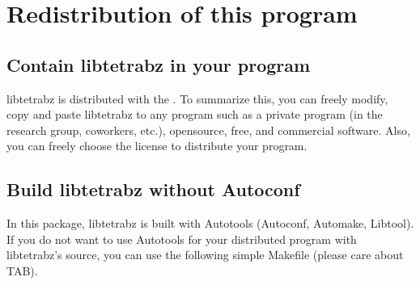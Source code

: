 \documentclass[letterpaper,10pt,pdftex,openany,english]{sphinxmanual}
\begin{document}
\begin{sphinxVerbatim}[commandchars=\\\{\}]
\end{sphinxVerbatim}

\sphinxstepscope


\chapter{Re\sphinxhyphen{}distribution of this program}
\label{\detokenize{copy:re-distribution-of-this-program}}\label{\detokenize{copy::doc}}

\section{Contain libtetrabz in your program}
\label{\detokenize{copy:contain-libtetrabz-in-your-program}}
\sphinxAtStartPar
libtetrabz is distributed with the {\hyperref[\detokenize{copy:mitlicense}]{}}.
To summarize this, you can freely modify, copy and paste libtetrabz to any program
such as a private program (in the research group, co\sphinxhyphen{}workers, etc.),
open\sphinxhyphen{}source, free, and commercial software.
Also, you can freely choose the license to distribute your program.


\section{Build libtetrabz without Autoconf}
\label{\detokenize{copy:build-libtetrabz-without-autoconf}}
\sphinxAtStartPar
In this package, libtetrabz is built with Autotools (Autoconf, Automake, Libtool).
If you do not want to use Autotools for your distributed program with libtetrabz’s source,
you can use the following simple Makefile (please care about TAB).
\end{document}
